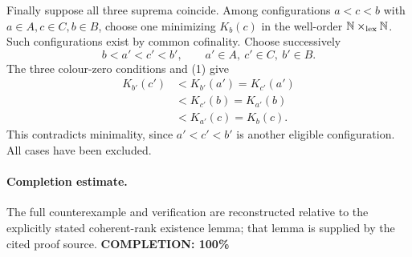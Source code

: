 Finally suppose all three suprema coincide. Among configurations \(a<c<b\) with \(a\in A,c\in C,b\in B\), choose one minimizing \(K_b(c)\) in the well-order \(\mathbb N\times_{\rm lex}\mathbb N\). Such configurations exist by common cofinality.
Choose successively
\[
 b<a'<c'<b',\qquad a'\in A,\ c'\in C,\ b'\in B.
\]
The three colour-zero conditions and (1) give
\[
 \begin{aligned}
 K_{b'}(c')&<K_{b'}(a')=K_{c'}(a')\\
           &<K_{c'}(b)=K_{a'}(b)\\
           &<K_{a'}(c)=K_b(c).
 \end{aligned}
\]
This contradicts minimality, since \(a'<c'<b'\) is another eligible configuration. All cases have been excluded.

\paragraph{Completion estimate.}
The full counterexample and verification are reconstructed relative to the explicitly stated coherent-rank existence lemma; that lemma is supplied by the cited proof source.
\textbf{COMPLETION: 100\%}

